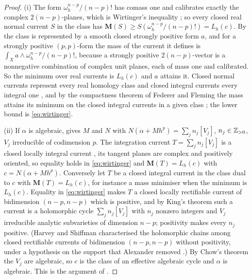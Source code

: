 \begin{proof}
(i) The form $\omega_{h}^{n-p}/(n-p)!$ has comass one and calibrates exactly
the complex $2(n-p)$-planes, which is Wirtinger's inequality
\cite[1.8.2]{Fed69}; so every closed real normal current $S$ in the class has
$\mathbf{M}(S)\ge S(\omega_{h}^{n-p}/(n-p)!)=L_{h}(c)$. By
 the class is represented by a smooth closed
strongly positive form $a$, and for a strongly positive $(p,p)$-form the mass of
the current it defines is $\int_{X}a\wedge\omega_{h}^{n-p}/(n-p)!$, because a
strongly positive $2(n-p)$-vector is a nonnegative combination of complex unit
planes, each of mass one and calibrated. So the minimum over real currents is
$L_{h}(c)$ and $a$ attains it. Closed normal currents represent every real
homology class and closed integral currents every integral one
\cite[5.11]{FF60}, and by the compactness theorem of Federer and Fleming the
mass attains its minimum on the closed integral currents in a given class
\cite[9.6]{FF60}; the lower bound is \eqref{eq:wirtinger}.

(ii) If $\alpha$ is algebraic,  gives $M$ and $N$ with
$N(\alpha+Mh^{p})=\sum_{j}n_{j}[V_{j}]$, $n_{j}\in\mathbb{Z}_{>0}$, $V_{j}$
irreducible of codimension $p$. The integration current $T=\sum_{j}n_{j}[V_{j}]$
is a closed locally integral current \cite[Theorem~3.1.1]{Kin71}, its tangent
planes are complex and positively oriented, so equality holds in
\eqref{eq:wirtinger} and $\mathbf{M}(T)=L_{h}(c)$ with $c=N(\alpha+Mh^{p})$.
Conversely let $T$ be a closed integral current in the class dual to $c$ with
$\mathbf{M}(T)=L_{h}(c)$, for instance a mass minimiser when the minimum is
$L_{h}(c)$. Equality in \eqref{eq:wirtinger} makes $T$ a closed locally
rectifiable current of bidimension $(n-p,n-p)$ which is positive, and by
King's theorem \cite[Theorem~5.2.1]{Kin71} such a current is a holomorphic
cycle $\sum_{j}n_{j}[V_{j}]$ with $n_{j}$ nonzero integers and $V_{j}$
irreducible analytic subvarieties of dimension $n-p$; positivity makes every
$n_{j}$ positive. (Harvey and Shiffman characterised the holomorphic chains
among closed rectifiable currents of bidimension $(n-p,n-p)$ without
positivity, under a hypothesis on the support that Alexander removed
\cite{HS74,Ale97}.) By Chow's theorem \cite[p.~167]{GH78} the $V_{j}$
are algebraic, so $c$ is the class of an effective algebraic cycle and $\alpha$
is algebraic. This is the argument of \cite[Proposition~6.13]{HL09}.


\end{proof}
